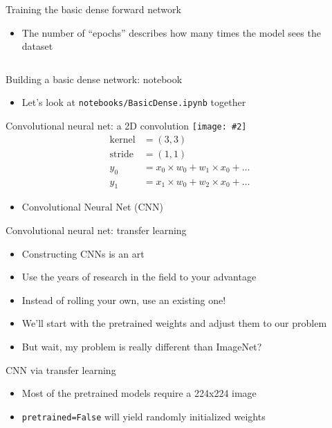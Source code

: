 \documentclass[hyperref={pdfpagelabels=false},12pt]{beamer}
\newcommand{\ig}[2]{\texttt{[image: \#2]}}
\newcommand{\code}[2]{\texttt{#2}}
\newcommand{\python}[1]{\code{python}{#1}}
\newcommand{\pygment}[3]{\inputminted[bgcolor=lightgray,linenos,fontsize=#1]{#2}{#3}}
\begin{document}
\begin{frame}{Training the basic dense forward network}
  \begin{itemize}
    \item The number of ``epochs'' describes how many times the model sees the dataset
  \end{itemize}
  \pygment{\scriptsize}{python}{code/training-dense-model.py}
\end{frame}

\begin{frame}{Building a basic dense network: notebook}
  \begin{itemize}
    \item Let's look at \texttt{notebooks/BasicDense.ipynb} together
  \end{itemize}
\end{frame}

\begin{frame}{Convolutional neural net: a 2D convolution}
  \centering
  \ig{0.75}{figures/convolution.png}
  \begin{align*}
    \mathrm{kernel} &= (3, 3) \\
    \mathrm{stride} &= (1, 1) \\
    y_0 &= x_0 \times w_0 + w_1 \times x_0 + \dots \\
    y_1 &= x_1 \times w_0 + w_2 \times x_0 + \dots
  \end{align*}
  \begin{itemize}
    \item Convolutional Neural Net (CNN)
  \end{itemize}
\end{frame}

\begin{frame}{Convolutional neural net: transfer learning}
  \begin{itemize}
    \item Constructing CNNs is an art
    \item Use the years of research in the field to your advantage
    \item Instead of rolling your own, use an existing one!
    \item We'll start with the pretrained weights and adjust them to our problem
    \item But wait, my problem is really different than ImageNet?
  \end{itemize}
\end{frame}

\begin{frame}{CNN via transfer learning}
  \begin{itemize}
    \item Most of the pretrained models require a 224x224 image
    \item \python{pretrained=False} will yield randomly initialized weights
  \end{itemize}
  \pygment{\scriptsize}{python}{code/transfer-model.py}
\end{frame}
\end{document}
